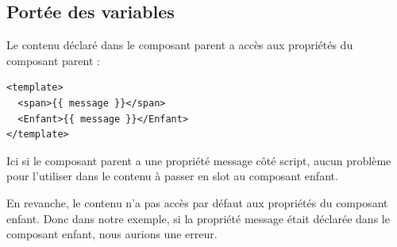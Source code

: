 \subsection{Portée des variables}
Le contenu déclaré dans le composant parent a accès aux propriétés du composant parent :
\begin{verbatim}
<template>
  <span>{{ message }}</span>
  <Enfant>{{ message }}</Enfant>
</template>
\end{verbatim}
Ici si le composant parent a une propriété {\color{monOrange}message} côté {\color{monOrange}script}, aucun problème pour l'utiliser dans le contenu à passer en {\color{monOrange}slot} au composant enfant.

En revanche, le contenu n'a pas accès par défaut aux propriétés du composant enfant. Donc dans notre exemple, si la propriété {\color{monOrange}message} était déclarée dans le composant enfant, nous aurions une erreur.

